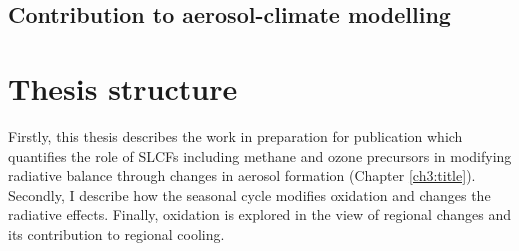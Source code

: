 \subsection{Contribution to aerosol-climate modelling}

\section{Thesis structure}


Firstly, this thesis describes the work in preparation for publication which quantifies the role of SLCFs including methane and ozone precursors in modifying radiative balance through changes in aerosol formation (Chapter \ref{ch3:title}). Secondly, I describe how the seasonal cycle modifies  oxidation and changes the radiative effects. Finally, oxidation is explored in the view of regional changes and its contribution to regional cooling. 